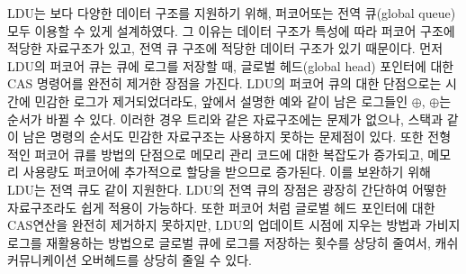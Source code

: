 LDU는 보다 다양한 데이터 구조를 지원하기 위해, 퍼코어또는 전역 큐(global queue) 모두 이용할 수 있게 설계하였다.
그 이유는 데이터 구조가 특성에 따라 퍼코어 구조에 적당한 자료구조가 있고,
전역 큐 구조에 적당한 데이터 구조가 있기 때문이다.
먼저 LDU의 퍼코어 큐는 큐에 로그를 저장할 때, 글로벌 헤드(global head) 포인터에 대한 CAS
명령어를 완전히 제거한 장점을 가진다.
LDU의 퍼코어 큐의 대한 단점으로는 시간에 민감한 로그가 제거되었더라도,
앞에서 설명한 예와 같이 남은 로그들인 $\oplus$, $\oplus$는 순서가 바뀔 수 있다.
이러한 경우 트리와 같은 자료구조에는 문제가 없으나, 스택과 같이 남은 명령의
순서도 민감한 자료구조는 사용하지 못하는 문제점이 있다.
또한 전형적인 퍼코어 큐를 방법의 단점으로 메모리 관리 코드에 대한 복잡도가 증가되고, 
메모리 사용량도 퍼코어에 추가적으로 할당을 받으므로 증가된다.
이를 보완하기 위해 LDU는 전역 큐도 같이 지원한다.
LDU의 전역 큐의 장점은 광장히 간단하여 어떻한 자료구조라도 쉽게 적용이 가능하다.
또한 퍼코어 처럼 글로벌 헤드 포인터에 대한 CAS연산을 완전히 제거하지 못하지만, LDU의 업데이트 시점에 
지우는 방법과 가비지 로그를 재활용하는 방법으로 글로벌 큐에 로그를 저장하는 횟수를 상당히 줄여서, 
캐쉬 커뮤니케이션 오버헤드를 상당히 줄일 수 있다. 

